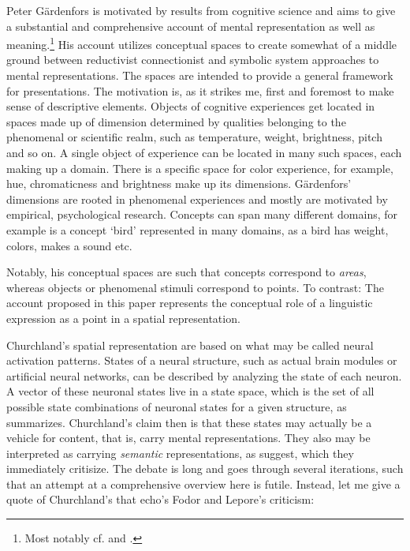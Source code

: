 \documentclass[11pt, a4paper]{scrartcl}
\renewcommand{\i}[1]{\emph{#1}}
\begin{document}
Peter Gärdenfors is motivated by results from cognitive science and aims to give a substantial and comprehensive account of mental representation as well as meaning.\footnote{Most notably cf. \textcite{gärdenfors2004conceptual} and \textcite{Gardenfors2014-GRDTGO}.} His account utilizes conceptual spaces to create somewhat of a middle ground between reductivist connectionist and symbolic system approaches to mental representations. The spaces are intended to provide a general framework for presentations. The motivation is, as it strikes me, first and foremost to make sense of descriptive elements. Objects of cognitive experiences get located in spaces made up of dimension determined by qualities belonging to the phenomenal or scientific realm, such as temperature, weight, brightness, pitch and so on. A single object of experience can be located in many such spaces, each making up a domain. There is a specific space for color experience, for example, hue, chromaticness and brightness make up its dimensions. Gärdenfors' dimensions are rooted in phenomenal experiences and mostly are motivated by empirical, psychological research. Concepts can span many different domains, for example is a concept `bird' represented in many domains, as a bird has weight, colors, makes a sound etc. 

Notably, his conceptual spaces are such that concepts correspond to \i{areas}, whereas objects or phenomenal stimuli correspond to points. To contrast: The account proposed in this paper represents the conceptual role of a linguistic expression as a point in a spatial representation.

Churchland's spatial representation are based on what may be called neural activation patterns. States of a neural structure, such as actual brain modules or artificial neural networks, can be described by analyzing the state of each neuron. A vector of these neuronal states live in a state space, which is the set of all possible state combinations of neuronal states for a given structure, as \textcite{Tiffany1999-TIFSSD-4} summarizes. Churchland's claim then is that these states may actually be a vehicle for content, that is, carry mental representations. They also may be interpreted as carrying \i{semantic} representations, as \textcite{Fodor1999-FODAAS} suggest, which they immediately critisize. The debate is long and goes through several iterations, such that an attempt at a comprehensive overview here is futile. Instead, let me give a quote of Churchland's that echo's Fodor and Lepore's criticism:
\end{document}
